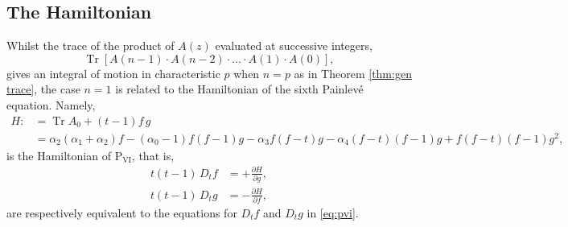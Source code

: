 \documentclass[a4paper,reqno]{amsart}
\numberwithin{equation}{section}
\numberwithin{figure}{section}
\theoremstyle{remark}
\newcommand\Psix{\textrm{P}_{\textrm{VI}}}
\begin{document}
\subsection{The Hamiltonian} Whilst the trace of the product of $A(z)$ evaluated at successive integers,
$$\operatorname{Tr}[A(n-1)\cdot A(n-2)\cdot\ldots\cdot A(1)\cdot A(0)],$$
gives an integral of motion in characteristic $p$ when $n=p$ as in Theorem \ref{thm:gen trace}, the case $n=1$ is related to the Hamiltonian of the sixth Painlev\'e equation. Namely,
\begin{align*}
    H:&=\operatorname{Tr}A_0+(t-1)f\,g\\
    &=\alpha_2(\alpha_1+\alpha_2)f-(\alpha_0-1)f(f-1)g-\alpha_3f(f-t)g-\alpha_4(f-t)(f-1)g+f(f-t)(f-1)g^2,
\end{align*}
is the Hamiltonian of $\Psix$, that is,
\begin{align*}
    t(t-1)\,D_tf&=+\frac{\partial H}{\partial g},\\
    t(t-1)\,D_tg&=-\frac{\partial H}{\partial f},
\end{align*}
are respectively equivalent to the equations for $D_tf$ and $D_tg$ in \eqref{eq:pvi}.
\end{document}

